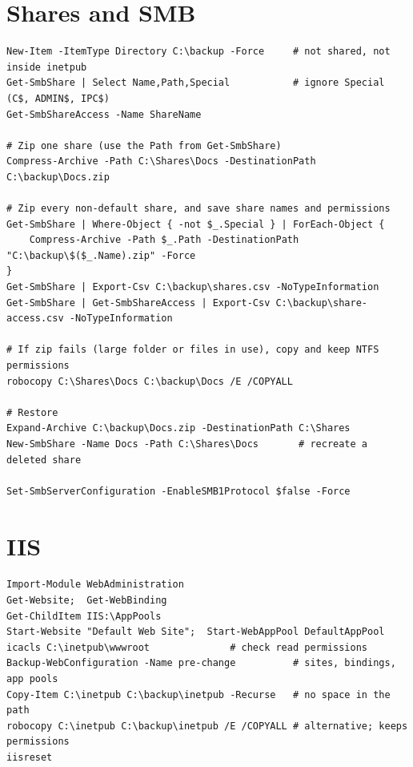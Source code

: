 \documentclass[11pt]{article}
\begin{document}
\section*{Shares and SMB}
{\footnotesize
\begin{verbatim}
New-Item -ItemType Directory C:\backup -Force     # not shared, not inside inetpub
Get-SmbShare | Select Name,Path,Special           # ignore Special (C$, ADMIN$, IPC$)
Get-SmbShareAccess -Name ShareName

# Zip one share (use the Path from Get-SmbShare)
Compress-Archive -Path C:\Shares\Docs -DestinationPath C:\backup\Docs.zip

# Zip every non-default share, and save share names and permissions
Get-SmbShare | Where-Object { -not $_.Special } | ForEach-Object {
    Compress-Archive -Path $_.Path -DestinationPath "C:\backup\$($_.Name).zip" -Force
}
Get-SmbShare | Export-Csv C:\backup\shares.csv -NoTypeInformation
Get-SmbShare | Get-SmbShareAccess | Export-Csv C:\backup\share-access.csv -NoTypeInformation

# If zip fails (large folder or files in use), copy and keep NTFS permissions
robocopy C:\Shares\Docs C:\backup\Docs /E /COPYALL

# Restore
Expand-Archive C:\backup\Docs.zip -DestinationPath C:\Shares
New-SmbShare -Name Docs -Path C:\Shares\Docs       # recreate a deleted share

Set-SmbServerConfiguration -EnableSMB1Protocol $false -Force
\end{verbatim}
}

\section*{IIS}
{\footnotesize
\begin{verbatim}
Import-Module WebAdministration
Get-Website;  Get-WebBinding
Get-ChildItem IIS:\AppPools
Start-Website "Default Web Site";  Start-WebAppPool DefaultAppPool
icacls C:\inetpub\wwwroot              # check read permissions
Backup-WebConfiguration -Name pre-change          # sites, bindings, app pools
Copy-Item C:\inetpub C:\backup\inetpub -Recurse   # no space in the path
robocopy C:\inetpub C:\backup\inetpub /E /COPYALL # alternative; keeps permissions
iisreset
\end{verbatim}
}
\end{document}
